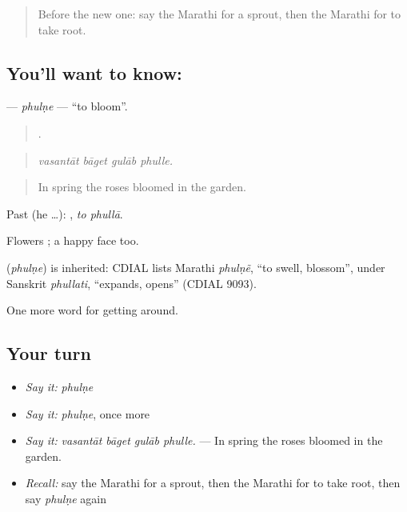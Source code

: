 \label{lesson:MR-C445-phulne}



\begin{quote}
Before the new one: say the Marathi for a sprout, then the Marathi for to take root.
\end{quote}

\subsection*{You'll want to know: }
\textbf{} — \emph{phulṇe} — \textquotedblleft{}to bloom\textquotedblright{}.

\begin{quote}
   .
\end{quote}

\begin{quote}
\emph{vasantāt bāget gulāb phulle.}
\end{quote}

\begin{quote}
In spring the roses bloomed in the garden.
\end{quote}

Past (he …):  , \emph{to phullā}.

Flowers ; a happy face  too.

\begin{cousinweb}
\textbf{} (\emph{phulṇe}) is inherited: CDIAL lists Marathi \emph{phulṇẽ}, \textquotedblleft{}to swell, blossom\textquotedblright{}, under Sanskrit \emph{phullati}, \textquotedblleft{}expands, opens\textquotedblright{} (CDIAL 9093).
\end{cousinweb}

\begin{grammarlens}[title={What you've built}]
One more word for getting around.
\end{grammarlens}

\subsection*{Your turn}
\begin{itemize}
\raggedright
  \item \emph{Say it:} \emph{phulṇe}
  \item \emph{Say it:} \emph{phulṇe}, once more
  \item \emph{Say it:} \emph{vasantāt bāget gulāb phulle.} — In spring the roses bloomed in the garden.
  \item \emph{Recall:} say the Marathi for a sprout, then the Marathi for to take root, then say \emph{phulṇe} again
\end{itemize}

